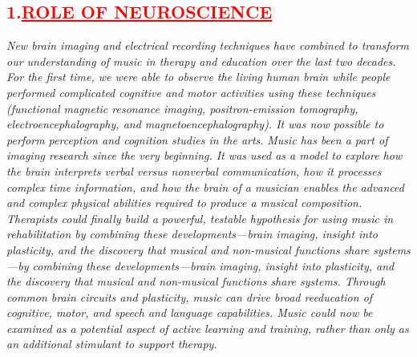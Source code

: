\documentclass[12pt]{article}
\begin{document}
\subsection*{\textbf{\hspace{1cm}\textcolor{red}{\huge{1.\underline{ROLE OF NEUROSCIENCE}}}}}
\hspace{1cm}\Large{\emph{New brain imaging and electrical recording techniques have combined to transform our understanding of music in therapy and education over the last two decades. For the first time, we were able to observe the living human brain while people performed complicated cognitive and motor activities using these techniques (functional magnetic resonance imaging, positron-emission tomography, electroencephalography, and magnetoencephalography). It was now possible to perform perception and cognition studies in the arts.}}\vspace{1cm}\newline
\hspace{1cm}\Large{\emph{Music has been a part of imaging research since the very beginning. It was used as a model to explore how the brain interprets verbal versus nonverbal communication, how it processes complex time information, and how the brain of a musician enables the advanced and complex physical abilities required to produce a musical composition.}}\vspace{1cm}\newline
\hspace{1cm}\Large{\emph{Therapists could finally build a powerful, testable hypothesis for using music in rehabilitation by combining these developments—brain imaging, insight into plasticity, and the discovery that musical and non-musical functions share systems—by combining these developments—brain imaging, insight into plasticity, and the discovery that musical and non-musical functions share systems. Through common brain circuits and plasticity, music can drive broad reeducation of cognitive, motor, and speech and language capabilities. Music could now be examined as a potential aspect of active learning and training, rather than only as an additional stimulant to support therapy.}}\vspace{1cm}
\end{document}
